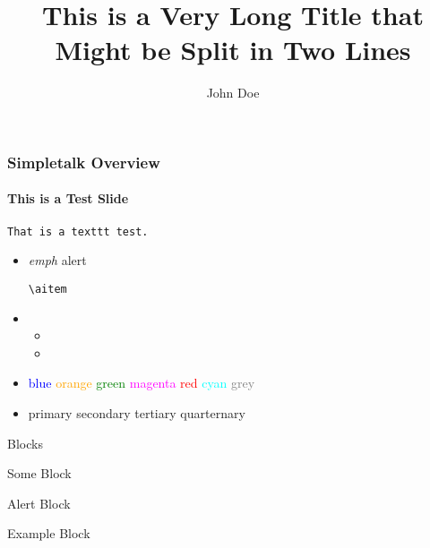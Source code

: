 \documentclass[aspectratio=169]{beamer}
\title{This is a Very Long Title that Might be Split in Two Lines}
\author{John Doe}
\institute{Some Institution}
\date{}
\begin{document}
\begin{frame}
    \titlepage
\end{frame}

\begin{frame}
    \frametitle{Simpletalk Overview}
    \framesubtitle{This is a Test Slide}
    \lipsum[1][2-3]
    \texttt{That is a texttt test.}
    \begin{itemize}
        \item {} \emph{emph}    \alert{alert}
        \begin{itemize}
            \aitem \texttt{\textbackslash aitem} \lipsum[1][1]
        \end{itemize}
        \item \lipsum[1][2-4]
        \begin{itemize}
            \item \lipsum[1][2-4]
            \item \lipsum[1][1]
        \end{itemize}
        \item
            \textcolor{blue}{blue}
            \textcolor{orange}{orange}
            \textcolor{green}{green}
            \textcolor{magenta}{magenta}
            \textcolor{red}{red}
            \textcolor{cyan}{cyan}
            \textcolor{grey}{grey}
        \item
            \textcolor{primary}{primary}
            \textcolor{secondary}{secondary}
            \textcolor{tertiary}{tertiary}
            \textcolor{quarternary}{quarternary}
    \end{itemize}
\end{frame}
\begin{frame}{Blocks}
    \begin{block}{Some Block}
       \lipsum[1][1] \faChessKnight
    \end{block}
    \begin{alertblock}{Alert Block}
       \lipsum[1][1] \faChessKnight
    \end{alertblock}
    \begin{exampleblock}{Example Block}
       \lipsum[1][1] \faChessKnight
    \end{exampleblock}
\end{frame}
\end{document}
